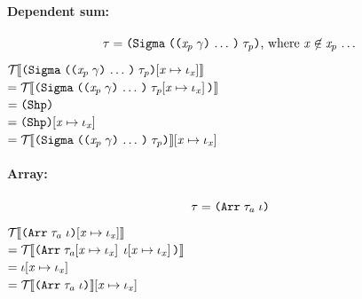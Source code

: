 \begin{sproof}
  \paragraph{Dependent sum:}
  \[\type = \typedsum{\sequence{\notevar{\var_p}{\sort}}}{\type_p}\text{, where }\var \not\in \sequence{\var_p}\]
  $\EraseT{\idxsubst{\typedsum{\sequence{\notevar{\var_p}{\sort}}}{\type_p}}}$ \\
  $= \EraseT{\typedsum{\sequence{\notevar{\var_p}{\sort}}}{\idxsubst{\type_p}}}$ \\
  $= \idxshape{}$ \\
  $= \idxsubst{\idxshape{}}$ \\
  $= \idxsubst{\EraseT{\typedsum{\sequence{\notevar{\var_p}{\sort}}}{\type_p}}}$ \\

  \paragraph{Array:}
  \[\type = \typearray{\type_a}{\idx}\]
  $\EraseT{\idxsubst{\typearray{\type_a}{\idx}}}$ \\
  $= \EraseT{\typearray{\idxsubst{\type_a}}{\idxsubst{\idx}}}$ \\
  $= \mathit{\iota}\hspace{-2pt}\left[ \mathit{x} \mapsto \mathit{\iota}_{\mathit{x}} \right]$ \\
  $= \idxsubst{\EraseT{\typearray{\type_a}{\idx}}}$ \\

\end{sproof}

